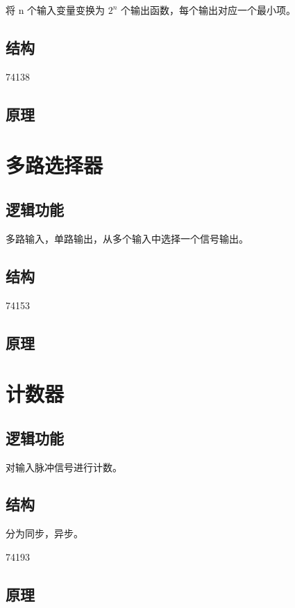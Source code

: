将 n 个输入变量变换为 $2^n$ 个输出函数，每个输出对应一个最小项。

\subsection{结构}

74138

\subsection{原理}


\newpage
\section{多路选择器}

\subsection{逻辑功能}

多路输入，单路输出，从多个输入中选择一个信号输出。

\subsection{结构}

74153

\subsection{原理}


\newpage
\section{计数器}

\subsection{逻辑功能}

对输入脉冲信号进行计数。

\subsection{结构}

分为同步，异步。

74193

\subsection{原理}


